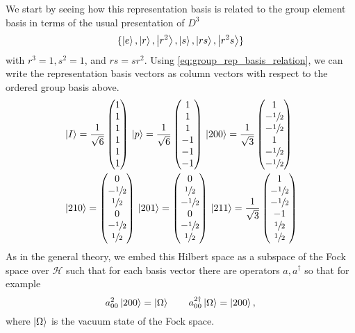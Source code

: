 \documentclass[10pt,reqno]{amsart}
\numberwithin{equation}{section}
\begin{document}
	We start by seeing how this representation basis is related to the group element basis in terms of the usual presentation of $D^3$	
		\[\{\ket{e}, \ket{r}, \ket{r^2}, \ket{s}, \ket{rs}, \ket{r^2s}\}\]
 	with $r^3=1, s^2=1$, and $rs=sr^2$.
 	Using \cref{eq:group_rep_basis_relation}, we can write the representation basis vectors as column vectors with respect to the ordered group basis above.
 	\begin{align*}
 		&\ket{I}=\frac{1}{\sqrt{6}}\begin{pmatrix}
 		1 \\ 1 \\ 1 \\ 1 \\ 1 \\ 1
 		\end{pmatrix}\,
 		\ket{p}=\frac{1}{\sqrt{6}}\begin{pmatrix}
 		1 \\ 1 \\ 1 \\ -1 \\ -1 \\ -1
 		\end{pmatrix}\,
 		\ket{200}=\frac{1}{\sqrt{3}}\begin{pmatrix}
 		1 \\ -\sfrac{1}{2} \\ -\sfrac{1}{2} \\ 1 \\ -\sfrac{1}{2} \\ -\sfrac{1}{2}
 		\end{pmatrix}\,\\
 		&\ket{210}=\begin{pmatrix}
 		0 \\ -\sfrac{1}{2} \\ \sfrac{1}{2} \\ 0 \\ -\sfrac{1}{2} \\ \sfrac{1}{2}
 		\end{pmatrix}\,
 		\ket{201}=\begin{pmatrix}
 		0 \\ \sfrac{1}{2} \\ -\sfrac{1}{2} \\ 0 \\ -\sfrac{1}{2} \\ \sfrac{1}{2}
 		\end{pmatrix}\,
 		\ket{211}=\frac{1}{\sqrt{3}}\begin{pmatrix}
 		1 \\ -\sfrac{1}{2} \\ -\sfrac{1}{2} \\ -1 \\ \sfrac{1}{2} \\ \sfrac{1}{2}
 		\end{pmatrix}
 	\end{align*}
	As in the general theory, we embed this Hilbert space as a subspace of the Fock space over $\mathcal{H}$ such that for each basis vector there are operators $a,a^\dagger$ so that for example
		\[a^2_{00}\ket{200}=\ket{\Omega} \qquad a^{2\dagger}_{00}\ket{\Omega}=\ket{200}, \]
	where $\ket{\Omega}$ is the vacuum state of the Fock space.
	
\end{document}
